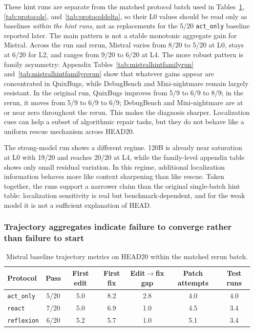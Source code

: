 \documentclass{article}
\begin{document}
These hint runs are separate from the matched protocol batch used in Tables~\ref{tab:trajmain}, \ref{tab:protocols}, and~\ref{tab:protocoldelta}, so their L0 values should be read only as baselines \emph{within the hint runs}, not as replacements for the 5/20 \texttt{act\_only} baseline reported later. The main pattern is not a stable monotonic aggregate gain for Mistral. Across the run and rerun, Mistral varies from 8/20 to 5/20 at L0, stays at 6/20 for L2, and ranges from 9/20 to 6/20 at L4. The more robust pattern is family asymmetry: Appendix Tables~\ref{tab:mistralhintfamilyrun} and~\ref{tab:mistralhintfamilyrerun} show that whatever gains appear are concentrated in QuixBugs, while DebugBench and Mini-nightmare remain largely resistant. In the original run, QuixBugs improves from 5/9 to 6/9 to 8/9; in the rerun, it moves from 5/9 to 6/9 to 6/9; DebugBench and Mini-nightmare are at or near zero throughout the rerun. This makes the diagnosis sharper. Localization cues can help a subset of algorithmic repair tasks, but they do not behave like a uniform rescue mechanism across HEAD20.

The strong-model run shows a different regime. 120B is already near saturation at L0 with 19/20 and reaches 20/20 at L4, while the family-level appendix table shows only small residual variation. In this regime, additional localization information behaves more like context sharpening than like rescue. Taken together, the runs support a narrower claim than the original single-batch hint table: localization sensitivity is real but benchmark-dependent, and for the weak model it is not a sufficient explanation of HEAD.

\subsubsection{Trajectory aggregates indicate failure to converge rather than failure to start}

\begin{table}[t]
\centering
\caption{Mistral baseline trajectory metrics on HEAD20 within the matched rerun batch.}
\label{tab:trajmain}
\begin{tabular}{lcccccc}
\toprule
Protocol & Pass & First edit & First fix & Edit$\rightarrow$fix gap & Patch attempts & Test runs \\
\midrule
\texttt{act\_only} & 5/20 & 5.0 & 8.2 & 2.8 & 4.0 & 4.0 \\
\texttt{react} & 7/20 & 5.0 & 6.9 & 1.0 & 4.5 & 3.4 \\
\texttt{reflexion} & 6/20 & 5.2 & 5.7 & 1.0 & 5.1 & 3.4 \\
\bottomrule
\end{tabular}
\end{table}
\end{document}
